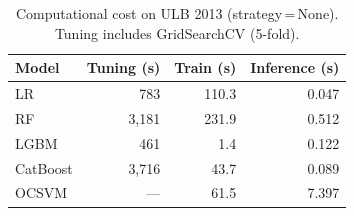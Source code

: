 \begin{table}[ht]
\centering
\caption{Computational cost on ULB 2013 (strategy\,=\,None). Tuning includes GridSearchCV (5-fold).}
\label{tab:cost_ulb}
\begin{tabular}{l r r r}
\toprule
Model & Tuning (s) & Train (s) & Inference (s) \\
\midrule
LR         & 783 & 110.3 & 0.047 \\
RF         & 3,181 & 231.9 & 0.512 \\
LGBM       & 461 & 1.4 & 0.122 \\
CatBoost   & 3,716 & 43.7 & 0.089 \\
OCSVM      & --- & 61.5 & 7.397 \\
\bottomrule
\end{tabular}
\end{table}
